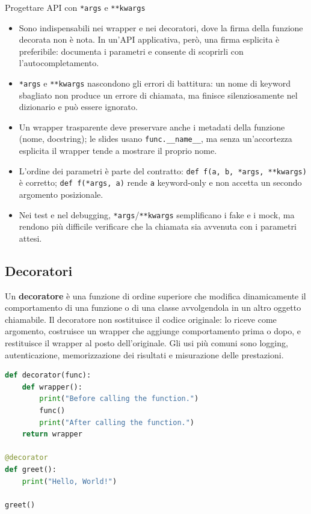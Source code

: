 \documentclass[12pt]{extarticle}
\begin{document}
\begin{cbox}{Progettare API con \texttt{*args} e \texttt{**kwargs}}
\begin{itemize}
    \item Sono indispensabili nei wrapper e nei decoratori, dove la firma della funzione decorata non è nota. In un'API applicativa, però, una firma esplicita è preferibile: documenta i parametri e consente di scoprirli con l'autocompletamento.
    \item \texttt{*args} e \texttt{**kwargs} nascondono gli errori di battitura: un nome di keyword sbagliato non produce un errore di chiamata, ma finisce silenziosamente nel dizionario e può essere ignorato.
    \item Un wrapper trasparente deve preservare anche i metadati della funzione (nome, docstring); le slides usano \texttt{func.\_\_name\_\_}, ma senza un'accortezza esplicita il wrapper tende a mostrare il proprio nome.
    \item L'ordine dei parametri è parte del contratto: \texttt{def f(a, b, *args, **kwargs)} è corretto; \texttt{def f(*args, a)} rende \texttt{a} keyword-only e non accetta un secondo argomento posizionale.
    \item Nei test e nel debugging, \texttt{*args}/\texttt{**kwargs} semplificano i fake e i mock, ma rendono più difficile verificare che la chiamata sia avvenuta con i parametri attesi.
\end{itemize}
\end{cbox}

\subsection{Decoratori}

\noindent Un \textbf{decoratore} è una funzione di ordine superiore che modifica dinamicamente il comportamento di una funzione o di una classe avvolgendola in un altro oggetto chiamabile. Il decoratore non sostituisce il codice originale: lo riceve come argomento, costruisce un wrapper che aggiunge comportamento prima o dopo, e restituisce il wrapper al posto dell'originale. Gli usi più comuni sono logging, autenticazione, memorizzazione dei risultati e misurazione delle prestazioni.

\begin{lstlisting}[language=Python]
def decorator(func):
    def wrapper():
        print("Before calling the function.")
        func()
        print("After calling the function.")
    return wrapper

@decorator
def greet():
    print("Hello, World!")

greet()
\end{lstlisting}
\end{document}
